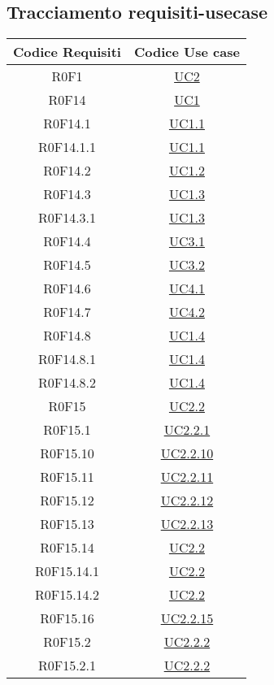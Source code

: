 \documentclass[../AnalisiDeiRequisiti.tex]{subfiles}
\begin{document}
\subsection{Tracciamento requisiti-usecase}
\normalsize
\begin{longtable}{|c|c|}
	\hline
	\textbf{Codice Requisiti} & \textbf{Codice Use case} \\
	\hline
	\endhead
	R0F1 & \hyperlink{UC2}{UC2}\\\hline
	R0F14 & \hyperlink{UC1}{UC1}\\\hline
	R0F14.1 & \hyperlink{UC1.1}{UC1.1}\\\hline
	R0F14.1.1 & \hyperlink{UC1.1}{UC1.1}\\\hline
	R0F14.2 & \hyperlink{UC1.2}{UC1.2}\\\hline
	R0F14.3 & \hyperlink{UC1.3}{UC1.3}\\\hline
	R0F14.3.1 & \hyperlink{UC1.3}{UC1.3}\\\hline
	R0F14.4 & \hyperlink{UC3.1}{UC3.1}\\\hline
	R0F14.5 & \hyperlink{UC3.2}{UC3.2}\\\hline
	R0F14.6 & \hyperlink{UC4.1}{UC4.1}\\\hline
	R0F14.7 & \hyperlink{UC4.2}{UC4.2}\\\hline
	R0F14.8 & \hyperlink{UC1.4}{UC1.4}\\\hline
	R0F14.8.1 & \hyperlink{UC1.4}{UC1.4}\\\hline
	R0F14.8.2 & \hyperlink{UC1.4}{UC1.4}\\\hline
	R0F15 & \hyperlink{UC2.2}{UC2.2}\\\hline
	R0F15.1 & \hyperlink{UC2.2.1}{UC2.2.1}\\\hline
	R0F15.10 & \hyperlink{UC2.2.10}{UC2.2.10}\\\hline
	R0F15.11 & \hyperlink{UC2.2.11}{UC2.2.11}\\\hline
	R0F15.12 & \hyperlink{UC2.2.12}{UC2.2.12}\\\hline
	R0F15.13 & \hyperlink{UC2.2.13}{UC2.2.13}\\\hline
	R0F15.14 & \hyperlink{UC2.2}{UC2.2}\\\hline
	R0F15.14.1 & \hyperlink{UC2.2}{UC2.2}\\\hline
	R0F15.14.2 & \hyperlink{UC2.2}{UC2.2}\\\hline
	R0F15.16 & \hyperlink{UC2.2.15}{UC2.2.15}\\\hline
	R0F15.2 & \hyperlink{UC2.2.2}{UC2.2.2}\\\hline
	R0F15.2.1 & \hyperlink{UC2.2.2}{UC2.2.2}\\\hline

\end{longtable}
\end{document}
